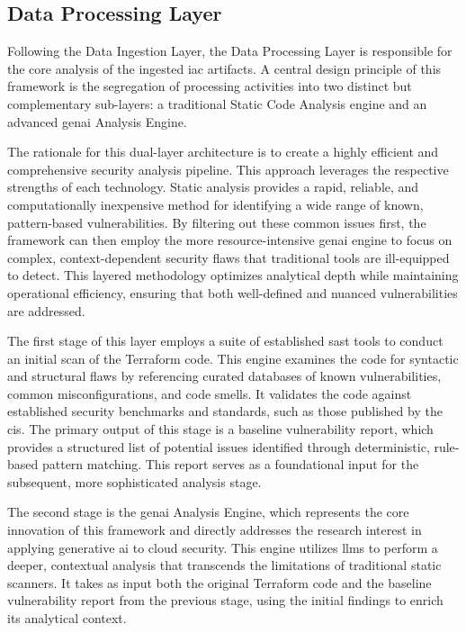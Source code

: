 
\subsection{Data Processing Layer} %
\label{sec:Data Processing Layer}

Following the Data Ingestion Layer, the Data Processing Layer is responsible for the core analysis of the ingested \gls{iac} artifacts. A central design principle of this framework is the segregation of processing activities into two distinct but complementary sub-layers: a traditional Static Code Analysis engine and an advanced \gls{genai} Analysis Engine.

The rationale for this dual-layer architecture is to create a highly efficient and comprehensive security analysis pipeline. This approach leverages the respective strengths of each technology. Static analysis provides a rapid, reliable, and computationally inexpensive method for identifying a wide range of known, pattern-based vulnerabilities. By filtering out these common issues first, the framework can then employ the more resource-intensive \gls{genai} engine to focus on complex, context-dependent security flaws that traditional tools are ill-equipped to detect. This layered methodology optimizes analytical depth while maintaining operational efficiency, ensuring that both well-defined and nuanced vulnerabilities are addressed.

The first stage of this layer employs a suite of established \gls{sast} tools to conduct an initial scan of the Terraform code. This engine examines the code for syntactic and structural flaws by referencing curated databases of known vulnerabilities, common misconfigurations, and code smells. It validates the code against established security benchmarks and standards, such as those published by the \gls{cis}. The primary output of this stage is a baseline vulnerability report, which provides a structured list of potential issues identified through deterministic, rule-based pattern matching. This report serves as a foundational input for the subsequent, more sophisticated analysis stage.

The second stage is the \gls{genai} Analysis Engine, which represents the core innovation of this framework and directly addresses the research interest in applying generative \gls{ai} to cloud security. This engine utilizes \glspl{llm} to perform a deeper, contextual analysis that transcends the limitations of traditional static scanners\cite{hayagreevan_security_2024, ling_enhancing_2024}. It takes as input both the original Terraform code and the baseline vulnerability report from the previous stage, using the initial findings to enrich its analytical context.

